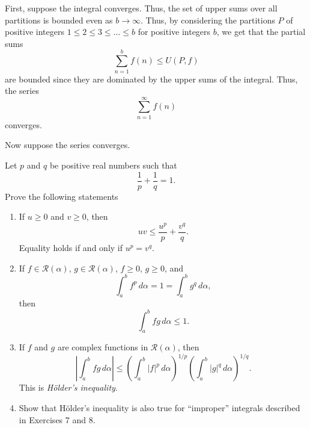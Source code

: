 \documentclass[12 pt, letterpaper]{hmcpset}
\begin{document}
\begin{solution}
	First, suppose the integral converges. Thus, the set of upper sums over all partitions is bounded even as $b \to \infty$. Thus, by considering the partitions $P$ of positive integers $1 \le 2 \le 3 \le \dots \le b$ for positive integers $b$, we get that the partial sums
	\[
		\sum_{n = 1}^{b} f(n) \le U(P, f)
	\]
	are bounded since they are dominated by the upper sums of the integral. Thus, the series
	\[
		\sum_{n = 1}^{\infty} f(n)
	\]
	converges.

	Now suppose the series converges.
\end{solution}

\pagebreak

\begin{problem}[10.]
	Let $p$ and $q$ be positive real numbers such that
	 \[
		\frac{1}{p} + \frac{1}{q} = 1.
	\]
	Prove the following statements
	\begin{enumerate}
		\item If $u \ge 0$ and $v \ge 0$, then
			\[
				uv \le \frac{u^{p}}{p} + \frac{v^{q}}{q}.
			\]
			Equality holds if and only if $u^{p} = v^{q}$.
		\item If $f \in \mathscr{R}(\alpha)$, $g \in \mathscr{R}(\alpha)$, $f \ge 0$, $g \ge 0$, and
			\[
				\int_{a}^{b} f^{p} \, d\alpha = 1 = \int_{a}^{b} g^{q} \, d\alpha,
			\]
			then
			\[
				\int_{a}^{b} fg \, d\alpha \le 1.
			\]
		\item If $f$ and $g$ are complex functions in $\mathscr{R}(\alpha)$, then
			\[
				\left \lvert \int_{a}^{b} fg \, d\alpha  \right \rvert \le \left ( \int_{a}^{b} \lvert f \rvert^{p} \, d\alpha  \right )^{1/p} \left ( \int_{a}^{b} \lvert g \rvert^{q} \, d\alpha  \right )^{1/q}. 
			\]
			This is \emph{H\"{o}lder's inequality}.
		\item Show that H\"{o}lder's inequality is also true for ``improper'' integrals described in Exercises 7 and 8.
	\end{enumerate}
\end{problem}
\end{document}
